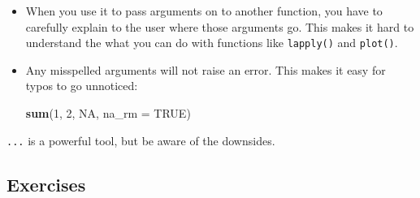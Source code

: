 \documentclass[]{book}
\newenvironment{Shaded}{\begin{snugshade}}{\end{snugshade}}
\newcommand{\KeywordTok}[1]{\textcolor[rgb]{0.13,0.29,0.53}{\textbf{#1}}}
\newcommand{\DataTypeTok}[1]{\textcolor[rgb]{0.13,0.29,0.53}{#1}}
\newcommand{\DecValTok}[1]{\textcolor[rgb]{0.00,0.00,0.81}{#1}}
\newcommand{\OtherTok}[1]{\textcolor[rgb]{0.56,0.35,0.01}{#1}}
\newcommand{\NormalTok}[1]{#1}
\theoremstyle{definition}
\theoremstyle{definition}
\theoremstyle{definition}
\theoremstyle{remark}
\begin{document}
\begin{itemize}
\item
  When you use it to pass arguments on to another function, you have to
  carefully explain to the user where those arguments go. This makes it
  hard to understand the what you can do with functions like
  \texttt{lapply()} and \texttt{plot()}.
\item
  Any misspelled arguments will not raise an error. This makes it easy
  for typos to go unnoticed:

\begin{Shaded}
\begin{Highlighting}[]
\KeywordTok{sum}\NormalTok{(}\DecValTok{1}\NormalTok{, }\DecValTok{2}\NormalTok{, }\OtherTok{NA}\NormalTok{, }\DataTypeTok{na_rm =} \OtherTok{TRUE}\NormalTok{)}
\end{Highlighting}
\end{Shaded}
\end{itemize}

\texttt{...} is a powerful tool, but be aware of the downsides.

\subsection{Exercises}\label{exercises-3}
\end{document}
